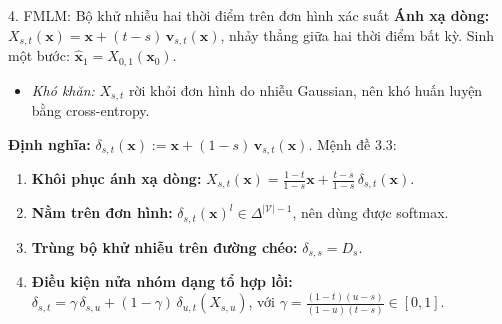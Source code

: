 \begin{frame}{4. FMLM: Bộ khử nhiễu hai thời điểm trên đơn hình xác suất}
    \textbf{Ánh xạ dòng:} $X_{s,t}(\mathbf{x}) = \mathbf{x} + (t-s)\,\mathbf{v}_{s,t}(\mathbf{x})$, nhảy thẳng giữa hai thời điểm bất kỳ. Sinh một bước: $\hat{\mathbf{x}}_1 = X_{0,1}(\mathbf{x}_0)$.
    \begin{itemize}
        \item \textit{Khó khăn:} $X_{s,t}$ rời khỏi đơn hình do nhiễu Gaussian, nên khó huấn luyện bằng cross-entropy.
    \end{itemize}
    \vspace{0.1cm}
    \textbf{Định nghĩa:} $\delta_{s,t}(\mathbf{x}) := \mathbf{x} + (1-s)\,\mathbf{v}_{s,t}(\mathbf{x})$. Mệnh đề 3.3:
    \begin{enumerate}
        \item \textbf{Khôi phục ánh xạ dòng:} $X_{s,t}(\mathbf{x}) = \frac{1-t}{1-s}\mathbf{x} + \frac{t-s}{1-s}\,\delta_{s,t}(\mathbf{x})$.
        \item \textbf{Nằm trên đơn hình:} $\delta_{s,t}(\mathbf{x})^l \in \Delta^{|\mathcal{V}|-1}$, nên dùng được softmax.
        \item \textbf{Trùng bộ khử nhiễu trên đường chéo:} $\delta_{s,s} = D_s$.
        \item \textbf{Điều kiện nửa nhóm dạng tổ hợp lồi:}
        $\delta_{s,t} = \gamma\,\delta_{s,u} + (1-\gamma)\,\delta_{u,t}(X_{s,u})$, với $\gamma = \frac{(1-t)(u-s)}{(1-u)(t-s)} \in [0,1]$.
    \end{enumerate}
\end{frame}

